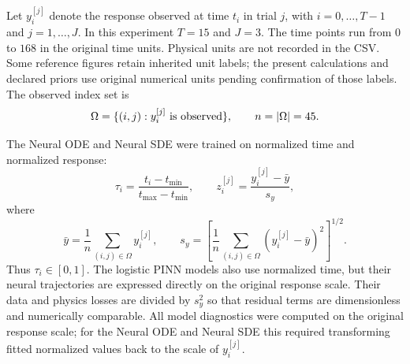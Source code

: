         Let $y_i^{[j]}$ denote the response observed at time $t_i$ in trial $j$,
    with $i=0,\ldots,T-1$ and $j=1,\ldots,J$. In this experiment $T=15$ and
    $J=3$. The time points run from $0$ to $168$ in the original time units.
    Physical units are not recorded in the CSV. Some reference figures retain
    inherited unit labels; the present calculations and declared priors use
    original numerical units pending confirmation of those labels.
    The observed index set is
    $$
    \Omega = \{(i,j): y_i^{[j]}\ \hbox{is observed}\},
    \qquad n = |\Omega| = 45.
    $$

        The Neural ODE and Neural SDE were trained on normalized time and
    normalized response:
    $$
        \tau_i = \frac{t_i-t_{\min}}{t_{\max}-t_{\min}},
        \qquad
        z_i^{[j]} = \frac{y_i^{[j]}-\bar y}{s_y},
    $$
    where
    $$
        \bar y = \frac{1}{n}\sum_{(i,j)\in\Omega} y_i^{[j]},
        \qquad
        s_y =
            \left[
                \frac{1}{n}\sum_{(i,j)\in\Omega}(y_i^{[j]}-\bar y)^2
            \right]^{1/2}.
    $$
    Thus $\tau_i\in[0,1]$. The logistic PINN models also use normalized time,
    but their neural trajectories are expressed directly on the original
    response scale. Their data and physics losses are divided by $s_y^2$ so
    that residual terms are dimensionless and numerically comparable. All model
    diagnostics were computed on the original response scale; for the Neural
    ODE and Neural SDE this required transforming fitted normalized values back
    to the scale of $y_i^{[j]}$.
